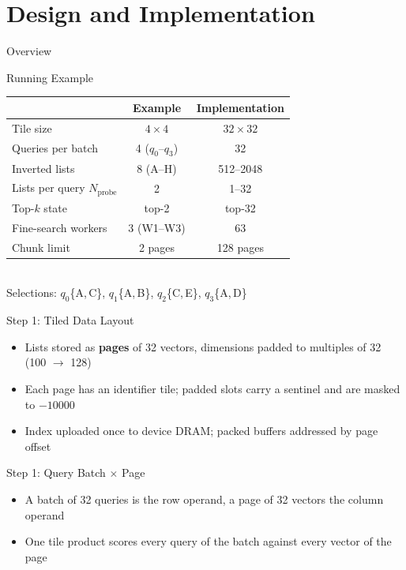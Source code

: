 \section{Design and Implementation}

\begin{frame}{Overview}
\end{frame}

\begin{frame}{Running Example}
  \centering\footnotesize
  \begin{tabular}{lcc}
    \toprule
    & Example & Implementation \\
    \midrule
    Tile size & $4\times4$ & $32\times32$ \\
    Queries per batch & 4 ($q_0$--$q_3$) & 32 \\
    Inverted lists & 8 (A--H) & 512--2048 \\
    Lists per query $N_{\mathrm{probe}}$ & 2 & 1--32 \\
    Top-$k$ state & top-2 & top-32 \\
    Fine-search workers & 3 (W1--W3) & 63 \\
    Chunk limit & 2 pages & 128 pages \\
    \bottomrule
  \end{tabular}\\[2mm]
  Selections: $q_0$\{A,\,C\}, $q_1$\{A,\,B\}, $q_2$\{C,\,E\}, $q_3$\{A,\,D\}
\end{frame}

\begin{frame}{Step 1: Tiled Data Layout}
  \begin{itemize}\footnotesize
    \item Lists stored as \textbf{pages} of 32 vectors, dimensions padded to multiples of 32 (100 $\to$ 128)
    \item Each page has an identifier tile; padded slots carry a sentinel and are masked to $-10000$
    \item Index uploaded once to device DRAM; packed buffers addressed by page offset
  \end{itemize}
\end{frame}

\begin{frame}{Step 1: Query Batch $\times$ Page}
  \begin{itemize}\footnotesize
    \item A batch of 32 queries is the row operand, a page of 32 vectors the column operand
    \item One tile product scores every query of the batch against every vector of the page
  \end{itemize}
\end{frame}

